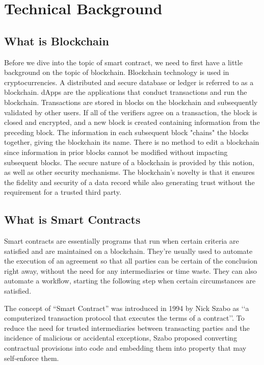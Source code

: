 \documentclass[10pt,twocolumn]{article}
\begin{document}
\section{Technical Background}

\subsection{What is Blockchain}
Before we dive into the topic of smart contract, we need to first have a little background on the topic of blockchain.
Blockchain technology is used in cryptocurrencies. A distributed and secure database or ledger is referred to as a blockchain. dApps are the applications that conduct transactions and run the blockchain. Transactions are stored in blocks on the blockchain and subsequently validated by other users. If all of the verifiers agree on a transaction, the block is closed and encrypted, and a new block is created containing information from the preceding block. The information in each subsequent block "chains" the blocks together, giving the blockchain its name. There is no method to edit a blockchain since information in prior blocks cannot be modified without impacting subsequent blocks. The secure nature of a blockchain is provided by this notion, as well as other security mechanisms. The blockchain's novelty is that it ensures the fidelity and security of a data record while also generating trust without the requirement for a trusted third party.\cite{Bartos}

\subsection{What is Smart Contracts}
Smart contracts are essentially programs that run when certain criteria are satisfied and are maintained on a blockchain. They're usually used to automate the execution of an agreement so that all parties can be certain of the conclusion right away, without the need for any intermediaries or time waste. They can also automate a workflow, starting the following step when certain circumstances are satisfied.

The concept of “Smart Contract” was introduced in 1994 by Nick Szabo as ‘‘a computerized transaction protocol that executes the terms of a contract’’.\cite{SzaboIdeaOf} To reduce the need for trusted intermediaries between transacting parties and the incidence of malicious or accidental exceptions, Szabo proposed converting contractual provisions into code and embedding them into property that may self-enforce them.\cite{SzaboSC}
\end{document}
